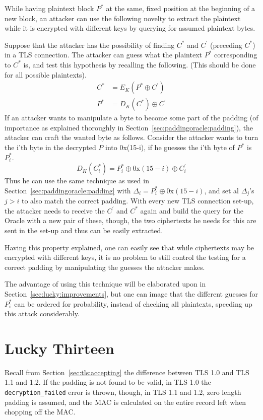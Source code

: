 \documentclass[10pt,conference,a4paper]{IEEEtran}
\begin{document}
While having plaintext block $P^{*}$ at the same, fixed position at the beginning of a new block, an attacker can use the following novelty to extract the plaintext while it is encrypted with different keys by querying for assumed plaintext bytes. 

Suppose that the attacker has the possibility of finding $C^{*}$ and $C^{'}$ (preceding $C^{*}$) in a TLS connection. The attacker can guess what the plaintext $P^{*}$ corresponding to $C^{*}$ is, and test this hypothesis by recalling the following. (This should be done for all possible plaintexts).
\[
\begin{split}
C^{*} &= E_K(P^{*} \oplus C^{'}) \\
P^{*} &= D_K(C^{*}) \oplus C^{'}
\end{split}
\]
If an attacker wants to manipulate a byte to become some part of the padding (of importance as explained thoroughly in Section~\ref{sec:paddingoracle:padding}), the attacker can craft the wanted byte as follows. Consider the attacker wants to turn the i'th byte in the decrypted $P$ into 0x(15-i), if he guesses the i'th byte of $P^{*}$ is $P_i^{*}$.
\[ D_K(C_i^{*}) = P_i^{*} \oplus 0\text{x}(15-i) \oplus C_i^{'} \]
Thus he can use the same technique as used in Section~\ref{sec:paddingoracle:padding} with $\Delta_i = P_i^{*} \oplus 0\text{x}(15-i)$, and set al $\Delta_j$'s $j>i$ to also match the correct padding. With every new TLS connection set-up, the attacker needs to receive the $C^{'}$ and $C^{*}$ again and build the query for the Oracle with a new pair of these, though, the two ciphertexts he needs for this are sent in the set-up and thus can be easily extracted.

Having this property explained, one can easily see that while ciphertexts may be encrypted with different keys, it is no problem to still control the testing for a correct padding by manipulating the guesses the attacker makes.

The advantage of using this technique will be elaborated upon in Section~\ref{sec:lucky:improvements}, but one can image that the different guesses for $P_i^{*}$ can be ordered for probability, instead of checking all plaintexts, speeding up this attack considerably.




\section{Lucky Thirteen}
\label{sec:lucky}
Recall from Section~\ref{sec:tls:accepting} the difference between TLS 1.0 and TLS 1.1 and 1.2. If the padding is not found to be valid, in TLS 1.0 the \texttt{decryption\_failed} error is thrown, though, in TLS 1.1 and 1.2, zero length padding is assumed, and the MAC is calculated on the entire record left when chopping off the MAC.
\end{document}

